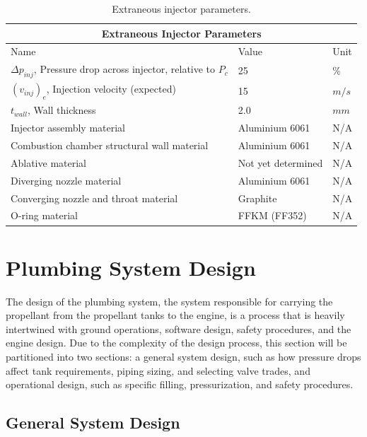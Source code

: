 \documentclass[9pt]{article} %
\numberwithin{equation}{section} %
\begin{document}
\begin{table}[!htb]
\centering
\begin{tabular}{  |p{8cm}||p{3cm}|p{1cm}|  }
\hline
\multicolumn{3}{|c|}{Extraneous Injector Parameters} \\
\hline
Name & Value & Unit \\ 
\hline
$\Delta p_{inj}$, Pressure drop across injector, relative to $P_{c}$ & 25 & \%  \\
$(v_{inj})_{e}$, Injection velocity (expected) & 15 &  $m/s$ \\
$t_{wall}$, Wall thickness & 2.0 & $mm$ \\
Injector assembly material & Aluminium 6061 & N/A \\
Combustion chamber structural wall material & Aluminium 6061 & N/A \\
Ablative material & Not yet determined & N/A \\
Diverging nozzle material & Aluminium 6061 & N/A \\
Converging nozzle and throat material & Graphite & N/A \\
O-ring material & FFKM (FF352) & N/A \\
\hline
\end{tabular}
\caption{Extraneous injector parameters.}
\label{table:injector_extraneous}
\end{table}

\section{Plumbing System Design}

\hspace{\parindent} The design of the plumbing system, the system responsible for carrying the propellant from the propellant tanks to the engine, is a process that is heavily intertwined with ground operations, software design, safety procedures, and the engine design. Due to the complexity of the design process, this section will be partitioned into two sections: a general system design, such as how pressure drops affect tank requirements, piping sizing, and selecting valve trades, and operational design, such as specific filling, pressurization, and safety procedures.

\subsection{General System Design}
\end{document}
